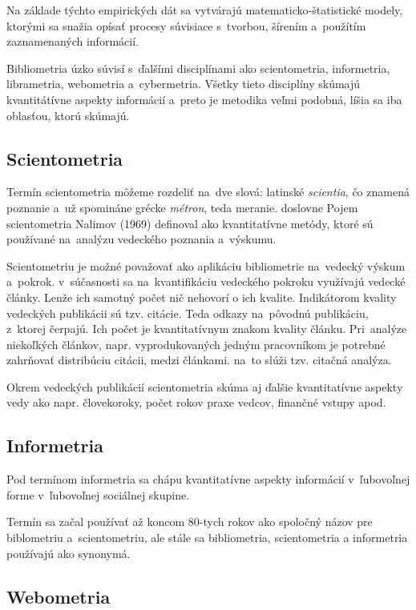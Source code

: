 Na základe týchto empirických dát sa vytvárajú matematicko-štatistické modely,
ktorými sa snažia opísať procesy súvisiace s~tvorbou, šírením a~použítím
zaznamenaných informácií. 

Bibliometria úzko súvisí s~ďalšími disciplínami ako scientometria, informetria,
librametria, webometria a~cybermetria. Všetky tieto disciplíny skúmajú
kvantitátívne aspekty informácií a~preto je metodika veľmi podobná, líšia sa iba
oblasťou, ktorú skúmajú.


\subsection{Scientometria}

Termín scientometria môžeme rozdeliť na~dve slová: latinské {\em scientia}, čo znamená
poznanie a~už spomináne grécke {\em métron}, teda meranie. doslovne  Pojem scientometria Nalimov (1969) definoval ako kvantitatívne
metódy, ktoré sú používané na~analýzu vedeckého poznania a~výskumu. 

Scientometriu je možné považovať ako aplikáciu bibliometrie na~vedecký výskum
a~pokrok. v~súčasnosti sa na~kvantifikáciu vedeckého pokroku využívajú vedecké
články. Lenže ich samotný počet nič nehovorí o ich kvalite. Indikátorom kvality
vedeckých publikácii sú tzv. citácie. Teda odkazy na~pôvodnú publikáciu,
z~ktorej čerpajú. Ich počet je kvantitatívnym znakom kvality článku.
Pri~analýze niekoľkých článkov, napr. vyprodukovaných jedným pracovníkom je
potrebné zahrňovať distribúciu citácii, medzi článkami. na~to slúži tzv. citačná
analýza.

Okrem vedeckých publikácií scientometria skúma aj ďalšie kvantitatívne aspekty
vedy ako napr. človekoroky, počet rokov praxe vedcov, finančné vstupy
apod. \citet{Bellis2009}


\subsection{Informetria}

Pod termínom informetria sa chápu kvantitatívne aspekty informácií v~ľubovoľnej
forme v~ľubovoľnej sociálnej skupine.

Termín sa začal používať až koncom 80-tych rokov ako spoločný názov pre
biblometriu a~scientometriu, ale stále sa bibliometria, scientometria a
informetria používajú ako synonymá.


\subsection{Webometria}

